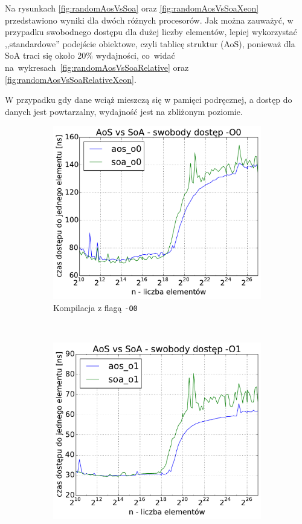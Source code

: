 Na rysunkach \ref{fig:randomAosVsSoa} oraz \ref{fig:randomAosVsSoaXeon} przedstawiono wyniki dla dwóch różnych procesorów. Jak można zauważyć, w przypadku swobodnego dostępu dla dużej liczby elementów, lepiej wykorzystać ,,standardowe'' podejście obiektowe, czyli tablicę struktur (AoS), ponieważ dla SoA traci się około 20\% wydajności, co~widać na~wykresach~\ref{fig:randomAosVsSoaRelative} oraz \ref{fig:randomAosVsSoaRelativeXeon}.

W przypadku gdy dane wciąż mieszczą się w pamięci podręcznej, a dostęp do danych jest powtarzalny, wydajność jest na zbliżonym poziomie.

\begin{figure}[!h]
    \centering
    \begin{subfigure}[c]{0.45\textwidth}
        \centering
        \includegraphics[width=\textwidth]{images/benchs/random_access_aos_vs_soa_O0}
        \caption{Kompilacja z flagą \texttt{-O0}}
    \end{subfigure}
    ~
    \begin{subfigure}[c]{0.45\textwidth}
        \centering
        \includegraphics[width=\textwidth]{images/benchs/random_access_aos_vs_soa_O1}

\end{subfigure}
\end{figure}
